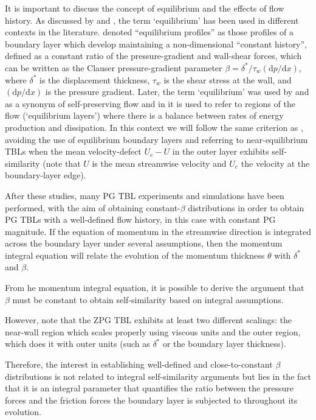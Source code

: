 It is important to discuss the concept of equilibrium and the effects of flow history. As discussed by \cite{Gibis2019} and \cite{Marusic_PoF_2010}, the term `equilibrium' has been used in different contexts in the literature. \cite{Clauser_1954_exp} denoted ``equilibrium profiles'' as those profiles of a boundary layer which develop maintaining a non-dimensional ``constant history'', defined as a constant ratio of the pressure-gradient and wall-shear forces, which can be written as the Clauser pressure-gradient parameter $\beta=\delta^{*}/\tau_w (\textrm{d}p/\textrm{d}x)$, where $\delta^{*}$ is the displacement thickness, $\tau_w$ is the shear stress at the wall, and $(\textrm{d}p/\textrm{d}x)$ is the pressure gradient. 
Later, the term `equilibrium' was used by \cite{rotta1962turbulent} and  \cite{townsend_1956_eqBL} as a synonym of self-preserving flow and in \cite{townsend_1961} it is used to refer to regions of the flow (`equilibrium layers') where there is a balance between rates of energy production and dissipation. In this context we will follow the same criterion as  \cite{Marusic_PoF_2010}, avoiding the use of equilibrium boundary layers and referring to near-equilibrium TBLs when the mean velocity-defect $U_{e}-U$ in the outer layer exhibits self-similarity (note that $U$ is the mean streamwise velocity and $U_e$ the velocity at the boundary-layer edge).

After these studies, many PG TBL experiments and simulations have been performed, with the aim of obtaining constant-$\beta$ distributions in order to obtain PG TBLs with a well-defined flow history, in this case with constant PG magnitude. 
If the equation of momentum in the streamwise direction is integrated across the boundary layer under several assumptions, then the momentum integral equation will relate the evolution of the momentum thickness $\theta$ with $\delta^*$ and $\beta$.

From he momentum integral equation, it is possible to derive the argument that $\beta$ must be constant to obtain self-similarity based on integral assumptions.

However, note that the ZPG TBL exhibits at least two different scalings: the near-wall region which scales properly using viscous units and the outer region, which does it with outer units (such as $\delta^*$ or the boundary layer thickness).

Therefore, the interest in establishing well-defined and close-to-constant $\beta$ distributions is not related to integral self-similarity arguments but lies in the fact that it is an integral parameter that quantifies the ratio between the pressure forces and the friction forces the boundary layer is subjected to throughout its evolution.

